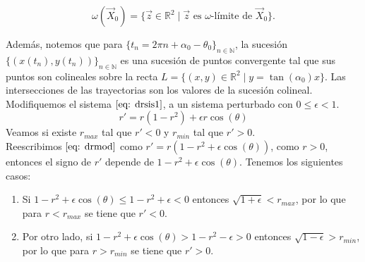 \documentclass[12pt, a4paper]{report}
\begin{document}
$$\omega(\vec{X}_0)=\{\vec{z}\in\mathbb{R}^2\mid\vec{z} \text{  es  } \omega\text{-límite de  } \vec{X}_0\}.$$

Además, notemos que para $\{t_n=2\pi n+\alpha_0-\theta_0\}_{n\in \mathbb{N}}$,
la sucesión $\{(x(t_n),y(t_n))\}_{n\in\mathbb{N}}$ es una sucesión
de puntos convergente tal que sus puntos son colineales sobre la recta
$L=\{(x,y)\in\mathbb{R}^2\mid y=\tan(\alpha_0)x \}$. Las intersecciones de las trayectorias
son los valores de la sucesión colineal.\\

Modifiquemos el sistema $\eqref{eq: drsis1}$, a un sistema perturbado
con $0\leq\epsilon<1$.
\begin{equation}\label{eq: drmod}
	r'=r(1-r^2)+\epsilon r\cos(\theta)
\end{equation}
Veamos si existe $r_{max}$ tal que $r'<0$ y $r_{min}$ tal que $r'>0$.\\

Reescribimos $\eqref{eq: drmod}$ como $r'=r(1-r^2+\epsilon \cos(\theta))$, como $r>0$,
entonces el signo de $r'$ depende de $1-r^2+\epsilon \cos(\theta)$.
Tenemos los siguientes casos:

\begin{enumerate}
	\item Si $1-r^2+\epsilon\cos(\theta)\leq 1-r^2+\epsilon<0$
	      entonces $\sqrt{1+\epsilon}<r_{max}$, por lo que para $r<r_{max}$ se tiene que $r'<0$.
	\item Por otro lado, si	$1-r^2+\epsilon\cos(\theta)>1-r^2-\epsilon>0$
	      entonces $\sqrt{1-\epsilon}>r_{min}$, por lo que para $r>r_{min}$ se tiene que $r'>0$.
\end{enumerate}
\end{document}
